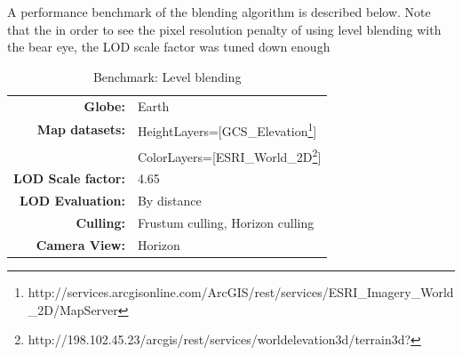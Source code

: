 A performance benchmark of the blending algorithm is described below. Note that the in order to see the pixel resolution penalty of using level blending with the bear eye, the LOD scale factor was tuned down enough 

\begin{table}
  \centering
  \caption[]{Benchmark: Level blending}
    \label{table:settingstopdown}
  \begin{tabular}{| r l |}
    \hline
      \textbf{Globe:}             & Earth \\
      \textbf{Map datasets:}      & HeightLayers=[GCS\_Elevation\footnote{http://services.arcgisonline.com/ArcGIS/rest/services/ESRI\_Imagery\_World\_2D/MapServer}] \\
                                  & ColorLayers=[ESRI\_World\_2D\footnote{http://198.102.45.23/arcgis/rest/services/worldelevation3d/terrain3d?}] \\
      \textbf{LOD Scale factor:}  & 4.65 \\
      \textbf{LOD Evaluation:}    & By distance \\
      \textbf{Culling:}           & Frustum culling, Horizon culling \\
      \textbf{Camera View:}       & Horizon \\
    \hline
  \end{tabular}
\end{table}


